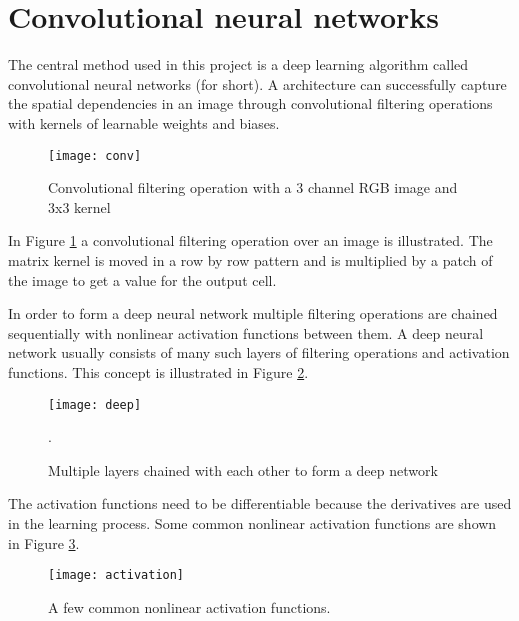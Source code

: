 \section{Convolutional neural networks}

The central method used in this project is a deep learning algorithm called convolutional neural networks (\abbrCNN for short). A \abbrCNN architecture can successfully capture the spatial dependencies in an image through convolutional filtering operations with kernels of learnable weights and biases.

\begin{figure}[H]
	\centering
	\texttt{[image: conv]}
	\caption{Convolutional filtering operation with a 3 channel RGB image and 3x3 kernel}
	\label{fig:conv}
\end{figure}

In Figure \ref{fig:conv} a convolutional filtering operation over an image is illustrated. The matrix kernel is moved in a row by row pattern and is multiplied by a patch of the image to get a value for the output cell.

In order to form a deep neural network multiple filtering operations are chained sequentially with nonlinear activation functions between them. A deep neural network usually consists of many such layers of filtering operations and activation functions. This concept is illustrated in Figure \ref{fig:deep}.

\begin{figure}[H]
	\centering
	\texttt{[image: deep]}
	\caption{Multiple layers chained with each other to form a deep network}.
	\label{fig:deep}
\end{figure}

The activation functions need to be differentiable because the derivatives are used in the learning process. Some common nonlinear activation functions are shown in Figure \ref{fig:activation}.

\begin{figure}[H]
	\centering
	\texttt{[image: activation]}
	\caption{A few common nonlinear activation functions.}
	\label{fig:activation}
\end{figure}

